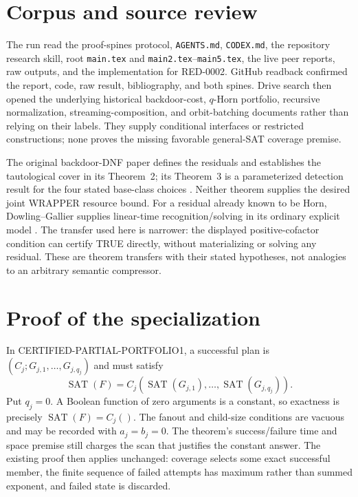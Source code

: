 \documentclass[11pt]{article}
\begin{document}
\section{Corpus and source review}
The run read the proof-spines protocol, \texttt{AGENTS.md}, \texttt{CODEX.md},
the repository research skill, root \texttt{main.tex} and
\texttt{main2.tex}--\texttt{main5.tex}, the live peer reports, raw outputs,
and the implementation for RED-0002.  GitHub readback confirmed the report,
code, raw result, bibliography, and both spines.  Drive search then opened the
underlying historical backdoor-cost, $q$-Horn portfolio, recursive
normalization, streaming-composition, and orbit-batching documents rather
than relying on their labels.  They supply conditional interfaces or
restricted constructions; none proves the missing favorable general-SAT
coverage premise.

The original backdoor-DNF paper defines the residuals and establishes the
tautological cover in its Theorem~2; its Theorem~3 is a parameterized
detection result for the four stated base-class choices
\cite{maehlmann2021}.  Neither theorem supplies the desired joint WRAPPER
resource bound.  For a residual already known to be Horn, Dowling--Gallier
supplies linear-time recognition/solving in its ordinary explicit model
\cite{dowling1984horn}.  The transfer used here is narrower: the displayed
positive-cofactor condition can certify TRUE directly, without materializing
or solving any residual.  These are theorem transfers with their stated
hypotheses, not analogies to an arbitrary semantic compressor.

\section{Proof of the specialization}
In CERTIFIED-PARTIAL-PORTFOLIO1, a successful plan is
$(C_j;G_{j,1},\ldots,G_{j,q_j})$ and must satisfy
\[
 \operatorname{SAT}(F)=C_j(\operatorname{SAT}(G_{j,1}),\ldots,
 \operatorname{SAT}(G_{j,q_j})).
\]
Put $q_j=0$.  A Boolean function of zero arguments is a constant, so exactness
is precisely $\operatorname{SAT}(F)=C_j()$.  The fanout and child-size
conditions are vacuous and may be recorded with $a_j=b_j=0$.  The theorem's
success/failure time and space premise still charges the scan that justifies
the constant answer.  The existing proof then applies unchanged: coverage
selects some exact successful member, the finite sequence of failed attempts
has maximum rather than summed exponent, and failed state is discarded.
\end{document}
